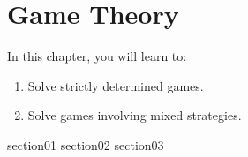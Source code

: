 \chapter{Game Theory}

In this chapter, you will learn to:
\begin{enumerate}
    \item Solve strictly determined games.
    \item Solve games involving mixed strategies.
\end{enumerate}

{section01}
{section02}
{section03}
